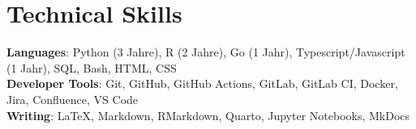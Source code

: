 \section{Technical Skills}

\begin{itemize}[leftmargin=0.15in, label={}]
    \small{\item{
                    \textbf{Languages}{: Python (3 Jahre), R (2 Jahre), Go (1 Jahr), Typescript/Javascript (1 Jahr), SQL, Bash, HTML, CSS} \\
                    \textbf{Developer Tools}{: Git, GitHub, GitHub Actions, GitLab, GitLab CI, Docker, Jira, Confluence, VS Code} \\
                    \textbf{Writing}{: LaTeX, Markdown, RMarkdown, Quarto, Jupyter Notebooks, MkDocs}
              }}
\end{itemize}
